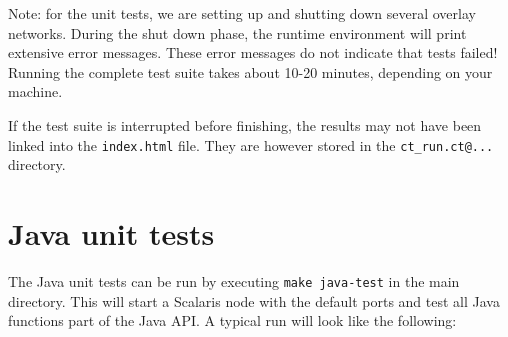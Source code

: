 \documentclass[a4paper]{scrreprt}
\newcommand{\code}[1]{\lstinline[basicstyle=\ttfamily]!#1!}
\begin{document}
Note: for the unit tests, we are setting up and shutting down several
overlay networks. During the shut down phase, the runtime environment
will print extensive error messages. These error messages do not
indicate that tests failed! Running the complete test suite takes
about 10-20 minutes, depending on your machine.

If the test suite is interrupted before finishing, the results may not have
been linked into the \code{index.html} file. They are however stored in the
\code{ct_run.ct@...} directory.

\section{Java unit tests}
The Java unit tests can be run by executing \code{make java-test} in the main
directory. This will start a Scalaris node with the default ports and test
all Java functions part of the Java API. A typical run will look like the
following:
\end{document}

